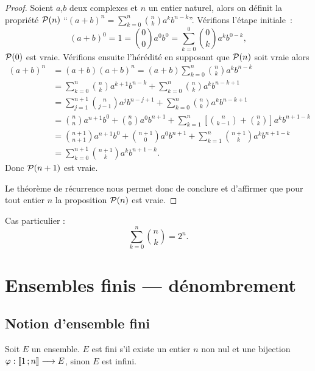 \begin{proof}
  Soient \(a\),\(b\) deux complexes et \(n\) un entier naturel, alors on
  définit la propriété \(\P(n)\) ``\((a + b)^n = \sum_{k = 0}^n
  \binom{n}{k}a^kb^{n - k}\)''. Vérifions l'étape initiale~:
  \begin{equation}
    (a + b)^0 = 1 = \binom{0}{0}a^0b^0 = \sum_{k = 0}^0 \binom{0}{k}a^kb^{0
    - k},
  \end{equation}
  \(\P(0)\) est vraie. Vérifions ensuite l'hérédité en supposant que
  \(\P(n)\) soit vraie alors
  \begin{align}
    (a + b)^n & = (a + b)(a + b)^n = (a + b)\sum_{k = 0}^n
    \binom{n}{k}a^kb^{n - k}\\
              & = \sum_{k = 0}^n \binom{n}{k}a^{k + 1}b^{n - k}+\sum_{k =
              0}^n \binom{n}{k}a^kb^{n - k + 1}\\
              & = \sum_{j = 1}^{n + 1} \binom{n}{j - 1}a^{j}b^{n - j +
              1}+\sum_{k = 0}^n \binom{n}{k}a^kb^{n - k + 1}\\
              & = \binom{n}{n}a^{n + 1}b^0 +\binom{n}{0}a^0b^{n + 1} +
              \sum_{k = 1}^{n}\left[\binom{n}{k -
              1}+\binom{n}{k}\right]a^kb^{n + 1 - k}\\
              & = \binom{n + 1}{n + 1}a^{n + 1}b^0 + \binom{n + 1}{0}a^0b^{n
              + 1}+ \sum_{k = 1}^{n}\binom{n + 1}{k}a^kb^{n + 1 - k}\\
              & = \sum_{k = 0}^{n + 1}\binom{n + 1}{k}a^kb^{n + 1 - k}.
  \end{align}
  Donc \(\P(n + 1)\) est vraie.

  Le théorème de récurrence nous permet donc de conclure et d'affirmer que
  pour tout entier \(n\) la proposition \(\P(n)\) est vraie.
\end{proof}
Cas particulier :
\begin{equation}
  \sum_{k = 0}^n \binom{n}{k} = 2^n.
\end{equation}

\section{Ensembles finis --- dénombrement}

\subsection{Notion d'ensemble fini}

\begin{defdef}
  Soit \(E\) un ensemble. \(E\) est fini s'il existe un entier \(n\) non nul
  et une bijection \(\fonctionR{\varphi}{\intervalleentier{1}{n}}{E}\),
  sinon \(E\) est infini.
\end{defdef}

